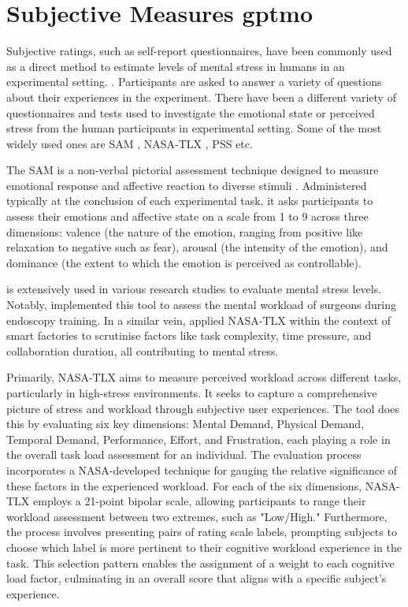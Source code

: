 \section{Subjective Measures \gls{gptmo}} 
\label{sec:nasa-tlx}


Subjective ratings, such as self-report questionnaires, have
been commonly used as a direct method to estimate levels of mental stress in humans in an experimental setting.
\parencite{aigram}. Participants are asked to answer a variety of
questions about their experiences in the experiment. There have been a different variety of questionnaires and tests used to investigate the emotional state or perceived stress from the human participants in experimental setting. Some of the most widely used ones are \gls{SAM} \parencite{SAM}, \gls{NASA-TLX} \parencite{tlx}, \gls{PSS} \parencite{pss} etc.

 The \gls{SAM} is a non-verbal pictorial assessment technique designed to measure emotional response and affective reaction to diverse stimuli \parencite{SAM}. Administered typically at the conclusion of each experimental task, it asks participants to assess their emotions and affective state on a scale from 1 to 9 across three dimensions: valence (the nature of the emotion, ranging from positive like relaxation to negative such as fear), arousal (the intensity of the emotion), and dominance (the extent to which the emotion is perceived as controllable).


  is extensively used in various research studies to evaluate mental stress levels. Notably, \textcite{tlxstress} implemented this tool to assess the mental workload of surgeons during endoscopy training. In a similar vein, \textcite{Zaki} applied \gls{NASA-TLX} within the context of smart factories to scrutinise factors like task complexity, time pressure, and collaboration duration, all contributing to mental stress.

 Primarily, \gls{NASA-TLX} aims to measure perceived workload across different tasks, particularly in high-stress environments. It seeks to capture a comprehensive picture of stress and workload through subjective user experiences. The tool does this by evaluating six key dimensions: Mental Demand, Physical Demand, Temporal Demand, Performance, Effort, and Frustration, each playing a role in the overall task load assessment for an individual. The evaluation process incorporates a NASA-developed technique for gauging the relative significance of these factors in the experienced workload. For each of the six dimensions, \gls{NASA-TLX} employs a 21-point bipolar scale, allowing participants to range their workload assessment between two extremes, such as "Low/High." Furthermore, the process involves presenting pairs of rating scale labels, prompting subjects to choose which label is more pertinent to their cognitive workload experience in the task. This selection pattern enables the assignment of a weight to each cognitive load factor, culminating in an overall score that aligns with a specific subject's experience.


